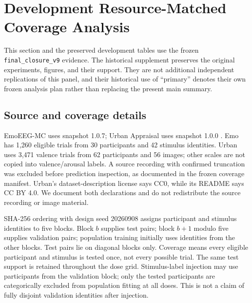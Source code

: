 \section{Development Resource-Matched Coverage Analysis}
\label{app:latest-evidence}
This section and the preserved development tables use the frozen
\texttt{final\_closure\_v9} evidence. The historical supplement preserves the original
experiments, figures, and their support. They are not additional independent
replications of this panel, and their historical use of ``primary'' denotes
their own frozen analysis plan rather than replacing the present main summary.

\subsection{Source and coverage details}
EmoEEG-MC uses snapshot 1.0.7; Urban Appraisal uses snapshot 1.0.0
\citep{openneuro_ds005540,openneuro_ds006850}.
Emo has 1,260 eligible trials from 30 participants and 42 stimulus identities.
Urban uses 3,471 valence trials from 62 participants and 56 images; other
scales are not copied into valence/arousal labels. A source recording with
confirmed truncation was excluded before prediction inspection, as documented
in the frozen coverage manifest. Urban's dataset-description license says CC0,
while its README says CC BY 4.0. We document both declarations and do not
redistribute the source recording or image material.

SHA-256 ordering with design seed 20260908 assigns participant and stimulus
identities to five blocks. Block $b$ supplies test pairs; block $b+1$ modulo five
supplies validation pairs; population training initially uses identities from
the other blocks. Test pairs lie on diagonal blocks only. Coverage means every
eligible participant and stimulus is tested once, not every possible trial.
The same test support is retained throughout the dose grid. Stimulus-label
injection may use participants from the validation block; only the tested
participants are categorically excluded from population fitting at all doses.
This is not a claim of fully disjoint validation identities after injection.

